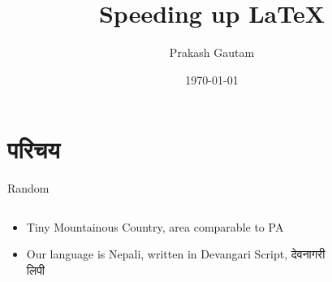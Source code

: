 \documentclass[aspectratio=169]{beamer}
\author{Prakash Gautam \\ \Nepali{[ प्रकाश गौतम ]}}
\title{Speeding up \LaTeX}
\date{\today}
\begin{document}
\titlepage

\renewcommand{\bf}[1]{\textcolor{red!60}{#1}}

\section{परिचय}
%
%
\begin{frame}{Random}
     \begin{columns}
        \begin{column}{0.49\textwidth}
            \begin{itemize}
                \item Tiny Mountainous Country, area comparable to PA
                \item Our language is Nepali, written in Devangari Script, {\Nepali देवनागरी लिपी}
            \end{itemize}
        \end{column}
        \begin{column}{0.49\textwidth}
            \begin{figure}[h!]
                \centering
            \end{figure}
        \end{column}
    \end{columns}
\end{frame} 
%
%
%
\end{document}
